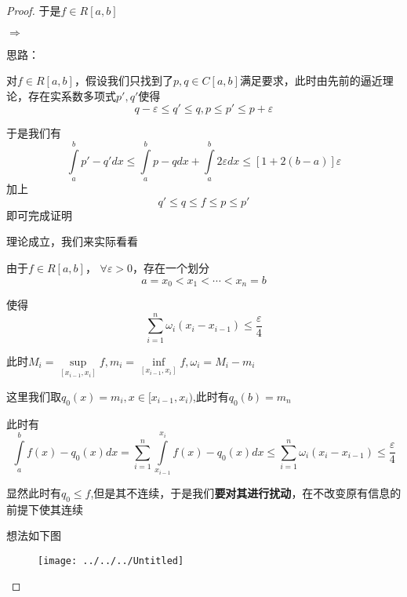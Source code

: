 \documentclass[lang=cn,10pt]{elegantbook}
\begin{document}
\begin{proof}
		于是$f\in R[a,b]$
		
		$\Rightarrow$
		
		思路：
		
		对$f\in R[a,b]$，假设我们只找到了$p,q\in C[a,b]$满足要求，此时由先前的逼近理论，存在实系数多项式$p',q'$使得
		\begin{equation*}
			q-\varepsilon \le q'\le q,p\le p'\le p+\varepsilon 
		\end{equation*}
		
		于是我们有
		\begin{equation*}
			\int\limits_a^b{p'-q'dx}\le \int\limits_a^b{p-qdx}+\int\limits_a^b{2\varepsilon dx}\le \left[ 1+2\left( b-a \right) \right] \varepsilon 
		\end{equation*}
		加上
		\begin{equation*}
			q'\le q\le f \le p \le p'
		\end{equation*}
		即可完成证明
		
		理论成立，我们来实际看看
		
		由于$f\in R[a,b]$，
			$\forall \varepsilon >0$，存在一个划分
		\begin{equation*}
			a=x_{0}<x_{1}<\cdots<x_{n}=b
		\end{equation*}
		
		使得
		\begin{equation*}
			\sum_{i=1}^n{\omega _i\left( x_i-x_{i-1} \right)}\le \frac{\varepsilon }{4}
		\end{equation*}
		
		此时$M_i=\mathop {\mathrm{sup}} \limits_{\left[ x_{i-1},x_i \right]}f,m_i=\mathop {\mathrm{inf}} \limits_{\left[ x_{i-1},x_i \right]}f,\omega _i=M_i-m_i$
		
		这里我们取$q_{0}(x)=m_{i},x\in [x_{i-1},x_{i})$,此时有$ q_{0}(b)=m_{n}$
		
		此时有
		\begin{equation*}
			\int\limits_a^b{f\left( x \right) -q_0\left( x \right) dx}=\sum_{i=1}^n{\int\limits_{x_{i-1}}^{x_i}{f\left( x \right) -q_0\left( x \right) dx}\le}\sum_{i=1}^n{\omega _i\left( x_i-x_{i-1} \right)}\le \frac{\varepsilon}{4}
		\end{equation*}
		
		显然此时有$q_{0}\le f$,但是其不连续，于是我们\textbf{要对其进行扰动}，在不改变原有信息的前提下使其连续
		
		想法如下图
		\begin{figure}[H]
			\centering
			\texttt{[image: ../../../Untitled]}
			\caption{}
			\label{fig:untitled}
		\end{figure}
		

\end{proof}
\end{document}
